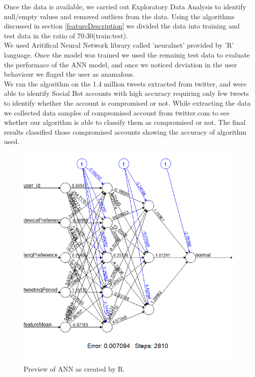 \documentclass[conference]{IEEEtran}
\begin{document}
  	Once the data is available, we carried out Exploratory Data Analysis to identify null/empty values and removed outliers from the data. Using the algorithms discussed in section \ref{featureDescription} we divided the data into training and test data in the ratio of 70:30(train:test).\\

	We used Aritifical Neural Network library called 'neuralnet' provided by 'R' language. Once the model was trained we used the remainig test data to evaluate the performace of the ANN model, and once we noticed deviation in the user behaviour we flaged the user as anamalous. \\
	
	We ran the algorithm on the 1.4 million tweets extracted from twitter, and were able to identify Social Bot accounts with high accuracy requiring only few tweets to identify whether the account is compromised or not.
 While extracting the data we collected data samples of compromised account from twitter.com to see whether our algorithm is able to classify them as compromised or not. The final results classified those compromised accounts showing the accuracy of algorithm used.


\begin{figure}[h!]
  \includegraphics[scale=0.4]{sample_ann}
  \caption{Preview of ANN as created by R.}
\end{figure}
\end{document}
